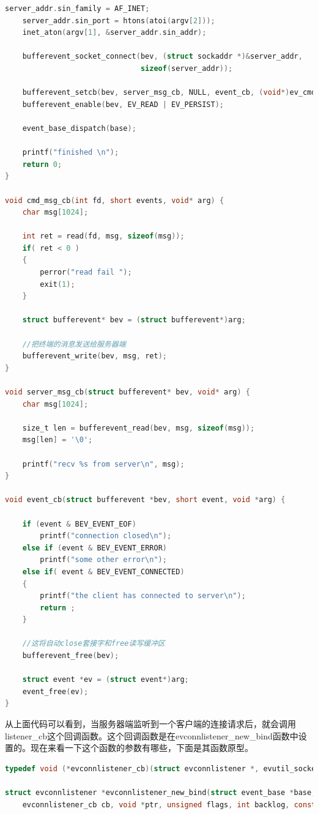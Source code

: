 \documentclass[11pt,a4paper]{article}
\begin{document}
\begin{lstlisting}[language=C]
    server_addr.sin_family = AF_INET;
    server_addr.sin_port = htons(atoi(argv[2]));
    inet_aton(argv[1], &server_addr.sin_addr);

    bufferevent_socket_connect(bev, (struct sockaddr *)&server_addr,
                               sizeof(server_addr));

    bufferevent_setcb(bev, server_msg_cb, NULL, event_cb, (void*)ev_cmd);
    bufferevent_enable(bev, EV_READ | EV_PERSIST);

    event_base_dispatch(base);

    printf("finished \n");
    return 0;
}

void cmd_msg_cb(int fd, short events, void* arg) {
    char msg[1024];

    int ret = read(fd, msg, sizeof(msg));
    if( ret < 0 )
    {
        perror("read fail ");
        exit(1);
    }

    struct bufferevent* bev = (struct bufferevent*)arg;

    //把终端的消息发送给服务器端
    bufferevent_write(bev, msg, ret);
}

void server_msg_cb(struct bufferevent* bev, void* arg) {
    char msg[1024];

    size_t len = bufferevent_read(bev, msg, sizeof(msg));
    msg[len] = '\0';

    printf("recv %s from server\n", msg);
}

void event_cb(struct bufferevent *bev, short event, void *arg) {

    if (event & BEV_EVENT_EOF)
        printf("connection closed\n");
    else if (event & BEV_EVENT_ERROR)
        printf("some other error\n");
    else if( event & BEV_EVENT_CONNECTED)
    {
        printf("the client has connected to server\n");
        return ;
    }

    //这将自动close套接字和free读写缓冲区
    bufferevent_free(bev);

    struct event *ev = (struct event*)arg;
    event_free(ev);
}
\end{lstlisting}

从上面代码可以看到，当服务器端监听到一个客户端的连接请求后，就会调用listener\_cb这个回调函数。这个回调函数是在evconnlistener\_new\_bind函数中设置的。现在来看一下这个函数的参数有哪些，下面是其函数原型。

\begin{lstlisting}[language=C]
typedef void (*evconnlistener_cb)(struct evconnlistener *, evutil_socket_t, struct sockaddr *, int socklen, void *);

struct evconnlistener *evconnlistener_new_bind(struct event_base *base,
	evconnlistener_cb cb, void *ptr, unsigned flags, int backlog, const struct sockaddr *sa, int socklen);
\end{lstlisting}
\end{document}
